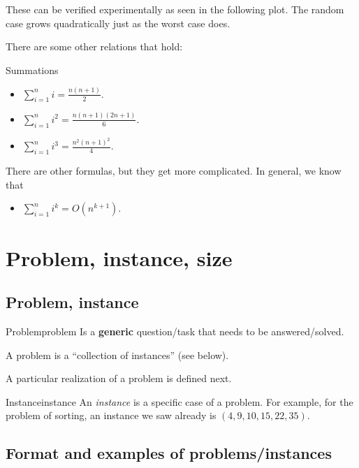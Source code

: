 

These can be verified experimentally  as seen in the following plot.  The random case grows quadratically just as the worst case does.  


There are some other relations that hold:
\begin{theorem}{Summations}{}
\begin{itemize}
\item $
\sum_{i=1}^{n} i = \frac{n(n+1)}{2}.
$
\item $
\sum_{i=1}^{n} i^2 = \frac{n(n+1)(2n+1)}{6}.
$
\item $
\sum_{i=1}^{n} i^3 = \frac{n^2(n+1)^2}{4}.
$
\end{itemize}
There are other formulas, but they get more complicated.  In general, we know that 
\begin{itemize}
\item $\sum_{i=1}^n i^k = O(n^{k+1}).$
\end{itemize}
\end{theorem}

\section{Problem, instance, size}
\subsection{Problem, instance}
\begin{definition}{Problem}{problem}
Is a {\bf generic} question/task that needs to be answered/solved. 

A problem is a ``collection of instances'' (see below).
\end{definition}

A  particular realization of a problem is defined next.

\begin{definition}{Instance}{instance}
An \emph{instance} is a specific case of a problem.  For example, for the problem of sorting, an instance we saw already is $(4,9,10,15,22,35)$.
\end{definition}

\subsection{Format and examples of problems/instances}

